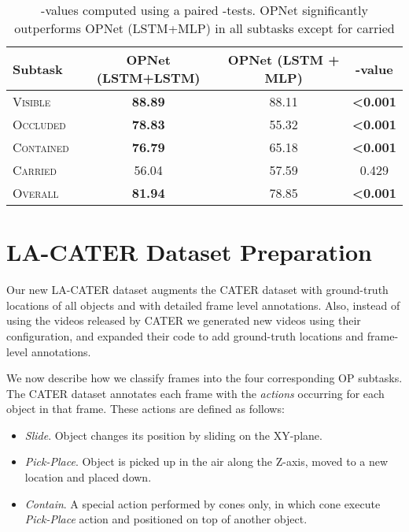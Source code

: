 \documentclass[]{llncs}
\begin{document}
{\begin{table}[]
    \caption{{-values computed using a paired -tests. OPNet significantly outperforms OPNet (LSTM+MLP) in all subtasks except for carried}}
\begin{center}
\begin{tabular}{|l|c|c|c|}
\hline
Subtask   & OPNet (LSTM+LSTM) & OPNet (LSTM + \textbf{MLP}) & -value          \\ \hline
\textsc{Visible}   & \textbf{88.89}             & 88.11              & \textbf{\textless{}0.001} \\ \hline
\textsc{Occluded}  & \textbf{78.83}             & 55.32              & \textbf{\textless{}0.001} \\ \hline
\textsc{Contained} & \textbf{76.79}             & 65.18              & \textbf{\textless{}0.001} \\ \hline
\textsc{Carried}   & 56.04                      & 57.59              & 0.429            \\ \hline
\textsc{Overall}   & \textbf{81.94}             & 78.85              & \textbf{\textless{}0.001} \\ \hline
\end{tabular}
\label{table:opnet_mlp_pvalue}
\end{center}
\end{table}

\newpage

}

\section{LA-CATER Dataset Preparation} \label{sec:la_cater_prep} Our new LA-CATER dataset augments the CATER dataset \cite{girdhar2019cater} with ground-truth locations of all objects and with detailed frame level annotations. Also, instead of using the videos released by CATER we
generated new videos using their configuration, and 
expanded their code to add ground-truth locations and frame-level annotations. 

We now describe how we classify frames into the four corresponding OP subtasks. The CATER dataset annotates each frame with the \textit{actions} occurring for each object in that frame. These actions are defined as follows:
\begin{itemize}
    \item \textit{Slide}.
    Object changes its position by sliding on the XY-plane. 
    \item \textit{Pick-Place}. 
    Object is picked up in the air along the Z-axis, moved to a new location and placed down.
    \item \textit{Contain}. 
    A special action performed by cones only, in which cone execute \textit{Pick-Place} action and positioned on top of another object.
\end{itemize}
\end{document}
